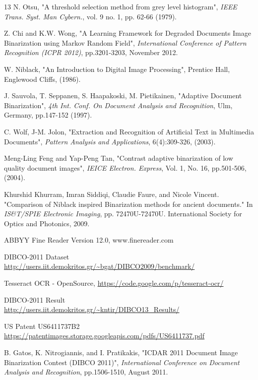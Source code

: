 \documentclass[conference]{IEEEtran}
\begin{document}
\begin{thebibliography}{13}
N. Otsu, "A threshold selection method from grey level histogram", \textit{IEEE Trans. Syst. Man Cybern.}, vol. 9 no. 1, pp. 62-66 (1979).

Z. Chi and K.W. Wong, "A Learning Framework for Degraded Documents Image Binarization using Markov Random Field", \textit{International Conference of Pattern Recognition (ICPR 2012)}, pp.3201-3203, November 2012.

W. Niblack, "An Introduction to Digital Image Processing", Prentice Hall, Englewood Cliffs, (1986).

J. Sauvola, T. Seppanen, S. Haapakoski, M. Pietikainen, "Adaptive Document Binarization", \textit{4th Int. Conf. On Document Analysis and Recognition}, Ulm, Germany, pp.147-152 (1997).

C. Wolf, J-M. Jolon, "Extraction and Recognition of Artificial Text in Multimedia Documents", \textit{Pattern Analysis and Applications}, 6(4):309-326, (2003).

Meng-Ling Feng and Yap-Peng Tan, "Contrast adaptive binarization of low quality document images", \textit{IEICE Electron. Express}, Vol. 1, No. 16, pp.501-506, (2004).

Khurshid Khurram, Imran Siddiqi, Claudie Faure, and Nicole Vincent. "Comparison of Niblack inspired Binarization methods for ancient documents." In \textit{IS\&T/SPIE Electronic Imaging}, pp. 72470U-72470U. International Society for Optics and Photonics, 2009.

ABBYY Fine Reader Version 12.0, www.finereader.com

DIBCO-2011 Dataset \\ \url{http://users.iit.demokritos.gr/~bgat/DIBCO2009/benchmark/}

Tesseract OCR - OpenSource, \url{https://code.google.com/p/tesseract-ocr/}

DIBCO-2011 Result \\ \url{http://users.iit.demokritos.gr/~kntir/DIBCO13_Results/}

US Patent US6411737B2 \\ \url{https://patentimages.storage.googleapis.com/pdfs/US6411737.pdf}

B. Gatos, K. Nitrogiannis, and I. Pratikakis, "ICDAR 2011 Document Image Binarization Contest (DIBCO 2011)", \textit{International Conference on Document Analysis and Recognition}, pp.1506-1510, August 2011.
\end{thebibliography}
\end{document}

